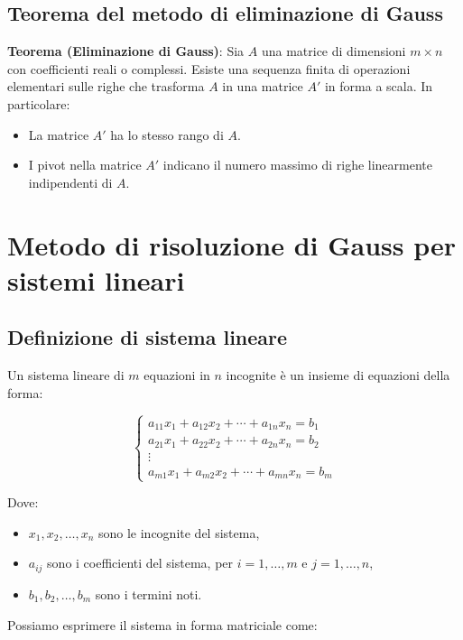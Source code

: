 \documentclass{article}
\begin{document}
\subsection{Teorema del metodo di eliminazione di Gauss}

\textbf{Teorema (Eliminazione di Gauss)}:
Sia \( A \) una  matrice di dimensioni \( m \times n \) con coefficienti reali o complessi.
Esiste una sequenza finita di operazioni elementari sulle righe che trasforma \( A \) in una matrice \( A' \)
in forma a scala. In particolare:
\begin{itemize}
	\item La matrice \( A' \) ha lo stesso rango di \( A \).
	\item I pivot nella matrice \( A' \) indicano il numero massimo di righe linearmente
	      indipendenti di \( A \).
\end{itemize}

\section{Metodo di risoluzione di Gauss per sistemi lineari}

\subsection{Definizione di sistema lineare}

Un sistema lineare di \( m \) equazioni in \( n \) incognite è un insieme di
equazioni della forma:

\[
	\begin{cases}
		a_{11}x_1 + a_{12}x_2 + \cdots + a_{1n}x_n = b_1 \\
		a_{21}x_1 + a_{22}x_2 + \cdots + a_{2n}x_n = b_2 \\
		\vdots                                           \\
		a_{m1}x_1 + a_{m2}x_2 + \cdots + a_{mn}x_n = b_m
	\end{cases}
\]

Dove:
\begin{itemize}
	\item \( x_1, x_2, \dots, x_n \) sono le incognite del sistema,
	\item \( a_{ij} \) sono i coefficienti del sistema, per \( i=1,\dots,m \) e \( j=1,\dots,n \),
	\item \( b_1, b_2, \dots, b_m \) sono i termini noti.
\end{itemize}

Possiamo esprimere il sistema in forma matriciale come:
\end{document}
